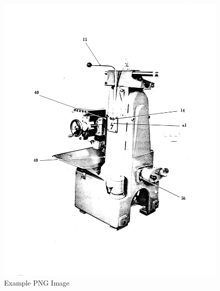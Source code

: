 \newpage
\begin{figure}[h]
    \centering
    \includegraphics[width=1.0\linewidth]{images/page_20}
    \caption{Example PNG Image}
    \label{fig:speeds_and_feeds_controls_2}
\end{figure}
